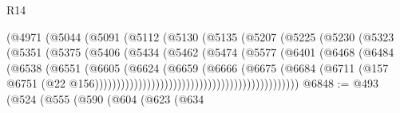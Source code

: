 \begin{lexlean}{R14}
\begin{coremodule}
                                    (@4971
                                      (@5044
                                        (@5091
                                          (@5112
                                            (@5130
                                              (@5135
                                                (@5207
                                                  (@5225
                                                    (@5230
                                                      (@5323
                                                        (@5351
                                                          (@5375
                                                            (@5406
                                                              (@5434
                                                                (@5462
                                                                  (@5474
                                                                    (@5577
                                                                      (@6401
                                                                        (@6468
                                                                          (@6484
                                                                            (@6538
                                                                              (@6551
                                                                                (@6605
                                                                                  (@6624
                                                                                    (@6659
                                                                                      (@6666
                                                                                        (@6675
                                                                                          (@6684
                                                                                            (@6711
                                                                                              (@157
                                                                                                @6751
                                                                                                (@22
                                                                                                  @156)))))))))))))))))))))))))))))))))))))))))))))))
@6848 := @493
    (@524
      (@555
        (@590
          (@604
            (@623
              (@634

\end{coremodule}
\end{lexlean}

